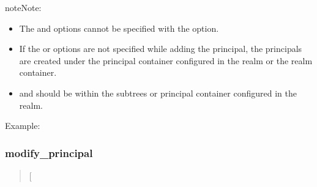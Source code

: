 \documentclass[letterpaper,10pt,english]{sphinxmanual}
\begin{document}
\begin{description}
\begin{description}
\end{description}

\begin{sphinxadmonition}{note}{Note:}\begin{itemize}
\item {} 
\sphinxAtStartPar
The  and  options cannot be
specified with the  option.

\item {} 
\sphinxAtStartPar
If the  or  options are not specified while
adding the principal, the principals are created under the
principal container configured in the realm or the realm
container.

\item {} 
\sphinxAtStartPar
{} and  should be within the subtrees or
principal container configured in the realm.

\end{itemize}
\end{sphinxadmonition}

\end{description}

\sphinxAtStartPar
Example:

\begin{sphinxVerbatim}[commandchars=\\\{\}]
  
    
   
    
    
  
\end{sphinxVerbatim}


\subsubsection{modify\_principal}
\label{\detokenize{admin/admin_commands/kadmin_local:modify-principal}}\label{\detokenize{admin/admin_commands/kadmin_local:id2}}\begin{quote}

\sphinxAtStartPar
{} {[}\sphinxstyleemphasis{options}{]} 
\end{quote}
\end{document}
